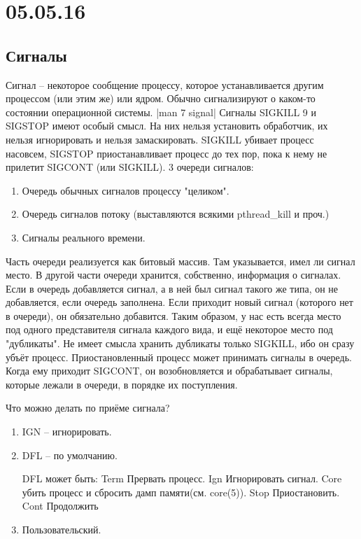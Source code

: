 \documentclass[a4paper,10pt]{article}
\begin{document}
\section{05.05.16}
\subsection{Сигналы}
Сигнал -- некоторое сообщение процессу, которое устанавливается другим процессом (или этим же) или ядром. Обычно сигнализируют о каком-то состоянии операционной системы.
|man 7 signal|
Сигналы SIGKILL 9 и SIGSTOP имеют особый смысл. На них нельзя установить обработчик, их нельзя игнорировать и нельзя замаскировать.
SIGKILL убивает процесс насовсем, SIGSTOP приостанавливает процесс до тех пор, пока к нему не прилетит SIGCONT (или SIGKILL).
3 очереди сигналов:
\begin{enumerate}
 \item Очередь обычных сигналов процессу "целиком".
 \item Очередь сигналов потоку (выставляются всякими pthread\_kill и проч.)
 \item Сигналы реального времени.
\end{enumerate}
Часть очереди реализуется как битовый массив. Там указывается, имел ли сигнал место. 
В другой части очереди хранится, собственно, информация о сигналах. Если в очередь добавляется сигнал, а в ней был сигнал такого же типа, он не добавляется, если очередь заполнена. Если приходит новый сигнал (которого нет в очереди), он обязательно добавится.
Таким образом, у нас есть всегда место под одного представителя сигнала каждого вида, и ещё некоторое место под "дубликаты".
Не имеет смысла хранить дубликаты только SIGKILL, ибо он сразу убъёт процесс.
Приостановленный процесс может принимать сигналы в очередь. Когда ему приходит SIGCONT, он возобновляется и обрабатывает сигналы, которые лежали в очереди, в порядке их поступления.

Что можно делать по приёме сигнала?
\begin{enumerate}
 \item IGN -- игнорировать.
 \item DFL -- по умолчанию.
 
DFL может быть:
Term   Прервать процесс.
Ign    Игнорировать сигнал.
Core   убить процесс и сбросить дамп памяти(см. core(5)).
Stop   Приостановить.
Cont   Продолжить
 \item Пользовательский.
\end{enumerate}
\end{document}
